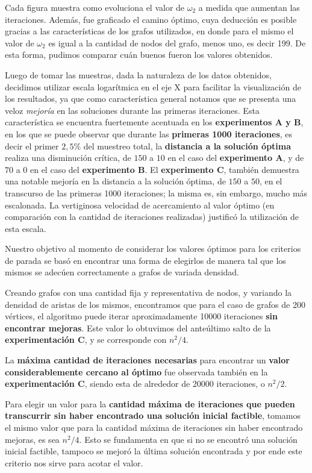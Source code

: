 Cada figura muestra como evoluciona el valor de $\omega_2$ a medida que aumentan las iteraciones. Además, fue graficado el camino óptimo, cuya deducción es posible gracias a las características de los grafos utilizados, en donde para el mismo el valor de $\omega_2$ es igual a la cantidad de nodos del grafo, menos uno, es decir 199. De esta forma, pudimos comparar cuán buenos fueron los valores obtenidos.

Luego de tomar las muestras, dada la naturaleza de los datos obtenidos, decidimos utilizar escala logarítmica en el eje X para facilitar la visualización de los resultados, ya que como característica general notamos que se presenta una veloz \textit{mejoría} en las soluciones durante las primeras iteraciones. Esta característica se encuentra fuertemente acentuada en los \textbf{experimentos A y B}, en los que se puede observar que durante las \textbf{primeras 1000 iteraciones}, es decir el primer $2,5\%$ del muestreo total, la \textbf{distancia a la solución óptima} realiza una disminución crítica, de $150$ a $10$ en el caso del \textbf{experimento A}, y de $70$ a $0$ en el caso del \textbf{experimento B}. El \textbf{experimento C}, también demuestra una notable mejoría en la distancia a la solución óptima, de $150$ a $50$, en el transcurso de las primeras 1000 iteraciones; la misma es, sin embargo, mucho más escalonada. La vertiginosa velocidad de acercamiento al valor óptimo (en comparación con la cantidad de iteraciones realizadas) justificó la utilización de esta escala. 

Nuestro objetivo al momento de considerar los valores óptimos para los criterios de parada se basó en encontrar una forma de elegirlos de manera tal que los mismos se adecúen correctamente a grafos de variada densidad. 

Creando grafos con una cantidad fija y representativa de nodos, y variando la densidad de aristas de los mismos, encontramos que para el caso de grafos de 200 vértices, el algoritmo puede iterar aproximadamente 10000 iteraciones \textbf{sin encontrar mejoras}. Este valor lo obtuvimos del anteúltimo salto de la \textbf{experimentación C}, y se corresponde con $n^2 / 4$.

La \textbf{máxima cantidad de iteraciones necesarias} para encontrar un \textbf{valor considerablemente cercano al óptimo} fue observada también en la \textbf{experimentación C}, siendo esta de alrededor de 20000 iteraciones, o $n^2 / 2$.

Para elegir un valor para la \textbf{cantidad máxima de iteraciones que pueden transcurrir sin haber encontrado una solución inicial factible}, tomamos el mismo valor que para la cantidad máxima de iteraciones sin haber encontrado mejoras, es sea $n^2 / 4$. Esto se fundamenta en que si no se encontró una solución inicial factible, tampoco se mejoró la última solución encontrada y por ende este criterio nos sirve para acotar el valor.

